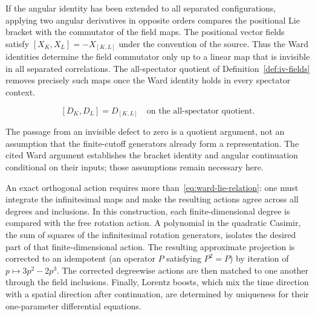 If the angular identity has been extended to all separated configurations, applying two angular derivatives in opposite orders compares the positional Lie bracket with the commutator of the field maps. The positional vector fields satisfy $[X_K,X_L]=-X_{[K,L]}$ under the convention of the source. Thus the Ward identities determine the field commutator only up to a linear map that is invisible in all separated correlations. The all-spectator quotient of Definition~\ref{def:iv-fields} removes precisely such maps once the Ward identity holds in every spectator context.

\begin{equation}\label{eq:ward-lie-relation}
 [D_K,D_L]=D_{[K,L]}\quad\text{on the all-spectator quotient}.
\end{equation}

The passage from an invisible defect to zero is a quotient argument, not an assumption that the finite-cutoff generators already form a representation. The cited Ward argument establishes the bracket identity and angular continuation conditional on their inputs; those assumptions remain necessary here.

An exact orthogonal action requires more than~\eqref{eq:ward-lie-relation}: one must integrate the infinitesimal maps and make the resulting actions agree across all degrees and inclusions. In this construction, each finite-dimensional degree is compared with the free rotation action. A polynomial in the quadratic Casimir, the sum of squares of the infinitesimal rotation generators, isolates the desired part of that finite-dimensional action. The resulting approximate projection is corrected to an idempotent (an operator $P$ satisfying $P^2=P$) by iteration of $p\mapsto3p^2-2p^3$. The corrected degreewise actions are then matched to one another through the field inclusions. Finally, Lorentz boosts, which mix the time direction with a spatial direction after continuation, are determined by uniqueness for their one-parameter differential equations.


